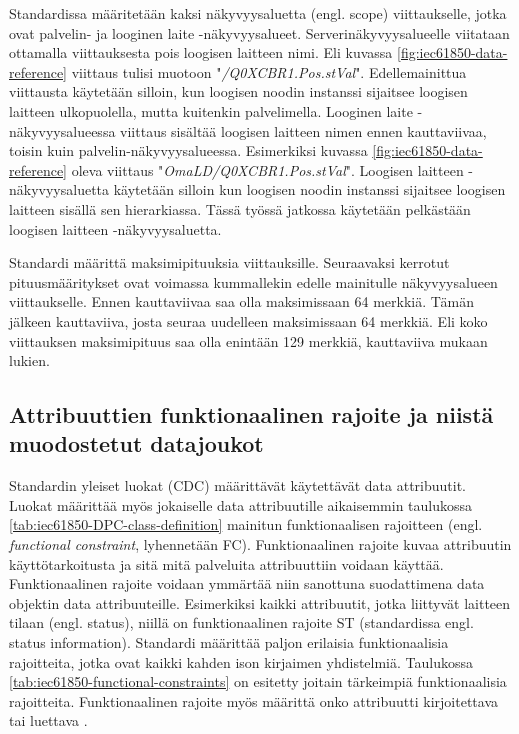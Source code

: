 Standardissa määritetään kaksi näkyvyysaluetta (engl. scope) viittaukselle, jotka ovat palvelin- ja looginen laite -näkyvyysalueet. Serverinäkyvyysalueelle viitataan ottamalla viittauksesta pois loogisen laitteen nimi. Eli kuvassa \ref{fig:iec61850-data-reference} viittaus tulisi muotoon "\emph{/Q0XCBR1.Pos.stVal}". Edellemainittua viittausta käytetään silloin, kun loogisen noodin instanssi sijaitsee loogisen laitteen ulkopuolella, mutta kuitenkin palvelimella. Looginen laite -näkyvyysalueessa viittaus sisältää loogisen laitteen nimen ennen kauttaviivaa, toisin kuin palvelin-näkyvyysalueessa. Esimerkiksi kuvassa \ref{fig:iec61850-data-reference} oleva viittaus "\emph{OmaLD/Q0XCBR1.Pos.stVal}". Loogisen laitteen -näkyvyysaluetta käytetään silloin kun loogisen noodin instanssi sijaitsee loogisen laitteen sisällä sen hierarkiassa. Tässä työssä jatkossa käytetään pelkästään loogisen laitteen -näkyvyysaluetta. \cite[s.~183]{IEC61850-7-2}

Standardi määrittä maksimipituuksia viittauksille. Seuraavaksi kerrotut pituusmääritykset ovat voimassa kummallekin edelle mainitulle näkyvyysalueen viittaukselle. Ennen kauttaviivaa saa olla maksimissaan 64 merkkiä. Tämän jälkeen kauttaviiva, josta seuraa uudelleen maksimissaan 64 merkkiä. Eli koko viittauksen maksimipituus saa olla enintään 129 merkkiä, kauttaviiva mukaan lukien. \cite[s.~24,183]{IEC61850-7-2}


\subsection{Attribuuttien funktionaalinen rajoite ja niistä muodostetut datajoukot}
Standardin yleiset luokat (CDC) määrittävät käytettävät data attribuutit. Luokat määrittää myös jokaiselle data attribuutille aikaisemmin taulukossa \ref{tab:iec61850-DPC-class-definition} mainitun funktionaalisen rajoitteen (engl. \emph{functional constraint}, lyhennetään FC). Funktionaalinen rajoite kuvaa attribuutin käyttötarkoitusta ja sitä mitä palveluita attribuuttiin voidaan käyttää. Funktionaalinen rajoite voidaan ymmärtää niin sanottuna suodattimena data objektin data attribuuteille. Esimerkiksi kaikki attribuutit, jotka liittyvät laitteen tilaan (engl. status), niillä on funktionaalinen rajoite ST (standardissa engl. status information). Standardi määrittää paljon erilaisia funktionaalisia rajoitteita, jotka ovat kaikki kahden ison kirjaimen yhdistelmiä. Taulukossa \ref{tab:iec61850-functional-constraints} on esitetty joitain tärkeimpiä funktionaalisia rajoitteita. Funktionaalinen rajoite myös määrittä onko attribuutti kirjoitettava tai luettava \cite[s.~54]{IEC61850-7-2}.

